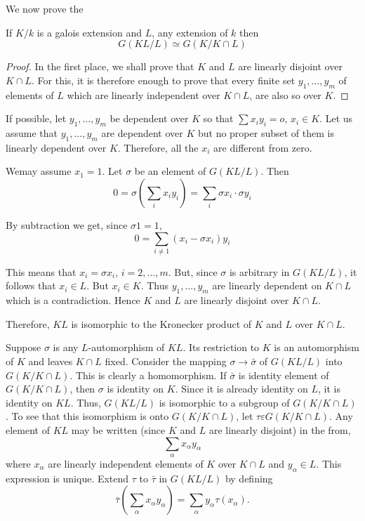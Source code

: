 We now prove the 

\begin{thm}\label{c5:thm7}%
 If $K/k$ is a galois extension and $L$, any extension of $k$ then
$$
G(KL/L) \simeq G(K/K  \cap  L)
$$
\end{thm}

\begin{proof}%
In the first place, we shall prove that $K$ and $L$ are linearly
disjoint over $K  \cap  L$. For this, it is therefore enough to prove
that every finite set $y_1, \ldots, y_m$ of elements of $L$ which are
linearly independent over $K  \cap  L$, are also so over $K$.  
\end{proof}

If possible, let $y_1, \ldots , y_m$ be dependent over $K$ so that
$\sum x_i  y_i = o$, $x_i  \in  K$. Let us assume that $y_1, \ldots ,
y_m$ are dependent over $K$ but no proper subset of them is linearly
dependent over $K$. Therefore, all the $x_i$ are different from zero. 

We\pageoriginale may assume $x_1 = 1$. Let $\sigma$ be an element of
$G(KL /L)$. Then 
$$ 
0 = \sigma (\sum_i x_i y_i) = \sum_i \sigma x_i\cdot \sigma y_i
$$

By subtraction we get, since $\sigma 1 = 1$, 
$$
0 = \sum_{i \neq 1} (x_i - \sigma x_i) y_i
$$

This means that $x_i = \sigma x_i$, $i=2 ,\ldots, m$. But, since
$\sigma$ is arbitrary in $G (KL/L)$, it follows that $x_i \in
L$. But $x_i \in K$. Thus $y_1 ,\ldots, y_m$ are linearly
dependent on $K \cap L$ which is a contradiction. Hence $K$ and $L$
are linearly disjoint over $K \cap L$. 

Therefore, $KL$ is isomorphic to the Kronecker product of $K$ and $L$
over $K \cap L $. 

Suppose $\sigma$ is any $L$-automorphism of $KL$. Its restriction to
$K$ is an automorphism of $K$ and leaves $K \cap L$ fixed. Consider
the mapping $\sigma \to \bar{\sigma}$ of $G(KL/L)$ into $G(K/K \cap
L)$. This is clearly a homomorphism. If $\bar{\sigma}$ is identity
element of $G(K /K \cap L)$, then $\sigma$ is identity on $K$. Since
it is already identity on $L$, it is identity on $KL$. Thus, $G (KL/L)$
is isomorphic to a subgroup of $G (K /K \cap L)$. To see that this
isomorphism is onto $G (K/K \cap L)$, let  $\tau \varepsilon G (K /K
\cap L)$. Any element of $KL$ may be written (since $K$ and $L$ are
linearly disjoint) in the from,   
$$
\sum_\alpha x_\alpha y_\alpha
$$
where $x_\alpha$ are linearly independent elements of $K$ over $K
\cap L$ and $y_\alpha \in L$. This expression is
unique. Extend $\tau$ to $\bar{\tau}$ in $G(KL/L)$ by defining  
$$
\bar{\tau} \left(\sum_\alpha x_\alpha y_\alpha \right) =
\sum_\alpha y_\alpha \tau (x_\alpha). 
$$

